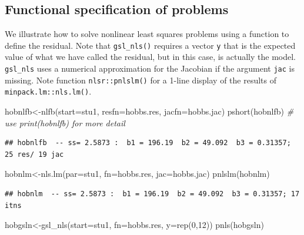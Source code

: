 \documentclass[
]{article}
\newenvironment{Shaded}{\begin{snugshade}}{\end{snugshade}}
\newcommand{\AttributeTok}[1]{\textcolor[rgb]{0.77,0.63,0.00}{#1}}
\newcommand{\CommentTok}[1]{\textcolor[rgb]{0.56,0.35,0.01}{\textit{#1}}}
\newcommand{\DecValTok}[1]{\textcolor[rgb]{0.00,0.00,0.81}{#1}}
\newcommand{\FunctionTok}[1]{\textcolor[rgb]{0.00,0.00,0.00}{#1}}
\newcommand{\NormalTok}[1]{#1}
\newcommand{\OtherTok}[1]{\textcolor[rgb]{0.56,0.35,0.01}{#1}}
\begin{document}
\hypertarget{functional-specification-of-problems}{%
\subsection{Functional specification of
problems}\label{functional-specification-of-problems}}

We illustrate how to solve nonlinear least squares problems using a
function to define the residual. Note that \texttt{gsl\_nls()} requires
a vector \texttt{y} that is the expected value of what we have called
the residual, but in this case, is actually the model. \texttt{gsl\_nls}
uses a numerical approximation for the Jacobian if the argument
\texttt{jac} is missing. Note function \texttt{nlsr::pnlslm()} for a
1-line display of the results of \texttt{minpack.lm::nls.lm()}.

\begin{Shaded}
\begin{Highlighting}[]
\NormalTok{hobnlfb}\OtherTok{\textless{}{-}}\FunctionTok{nlfb}\NormalTok{(}\AttributeTok{start=}\NormalTok{stu1, }\AttributeTok{resfn=}\NormalTok{hobbs.res, }\AttributeTok{jacfn=}\NormalTok{hobbs.jac)}
\FunctionTok{pshort}\NormalTok{(hobnlfb) }\CommentTok{\# use print(hobnlfb) for more detail}
\end{Highlighting}
\end{Shaded}

\begin{verbatim}
## hobnlfb  -- ss= 2.5873 :  b1 = 196.19  b2 = 49.092  b3 = 0.31357; 25 res/ 19 jac
\end{verbatim}

\begin{Shaded}
\begin{Highlighting}[]
\NormalTok{hobnlm}\OtherTok{\textless{}{-}}\FunctionTok{nls.lm}\NormalTok{(}\AttributeTok{par=}\NormalTok{stu1, }\AttributeTok{fn=}\NormalTok{hobbs.res, }\AttributeTok{jac=}\NormalTok{hobbs.jac)}
\FunctionTok{pnlslm}\NormalTok{(hobnlm)  }
\end{Highlighting}
\end{Shaded}

\begin{verbatim}
## hobnlm  -- ss= 2.5873 :  b1 = 196.19  b2 = 49.092  b3 = 0.31357; 17  itns
\end{verbatim}

\begin{Shaded}
\begin{Highlighting}[]
\NormalTok{hobgsln}\OtherTok{\textless{}{-}}\FunctionTok{gsl\_nls}\NormalTok{(}\AttributeTok{start=}\NormalTok{stu1, }\AttributeTok{fn=}\NormalTok{hobbs.res, }\AttributeTok{y=}\FunctionTok{rep}\NormalTok{(}\DecValTok{0}\NormalTok{,}\DecValTok{12}\NormalTok{))}
\FunctionTok{pnls}\NormalTok{(hobgsln)}
\end{Highlighting}
\end{Shaded}
\end{document}
